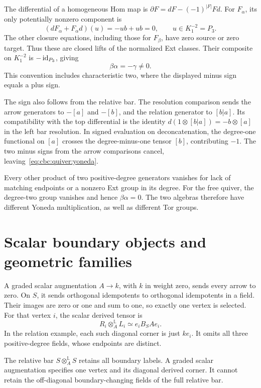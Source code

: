 The differential of a homogeneous Hom map is $\partial F=dF-(-1)^{|F|}Fd$.
For $F_\alpha$, its only potentially nonzero component is
\[
 (dF_\alpha+F_\alpha d)(u)=-ub+ub=0,
 \qquad u\in K_1^{-2}=P_3.
\]
The other closure equations, including those for $F_\beta$, have zero source or zero target.
Thus these are closed lifts of the normalized Ext classes.
Their composite on $K_1^{-2}$ is $-\operatorname{id}_{P_3}$, giving
\begin{equation}\label{eq:cbc:quiver:yoneda}
 \beta\alpha=-\gamma\ne0.
\end{equation}
This convention includes characteristic two, where the displayed minus sign equals a plus sign.

The sign also follows from the relative bar.
The resolution comparison sends the arrow generators to $-[a]$ and $-[b]$, and the relation generator to $[b|a]$.
Its compatibility with the top differential is the identity
$d(1\otimes[b|a])=-b\otimes[a]$ in the left bar resolution.
In signed evaluation on deconcatenation, the degree-one functional on $[a]$ crosses the degree-minus-one tensor $[b]$, contributing $-1$.
The two minus signs from the arrow comparisons cancel, leaving~\eqref{eq:cbc:quiver:yoneda}.

Every other product of two positive-degree generators vanishes for lack of matching endpoints or a nonzero Ext group in its degree.
For the free quiver, the degree-two group vanishes and hence $\beta\alpha=0$.
The two algebras therefore have different Yoneda multiplication, as well as different Tor groups.

\section{Scalar boundary objects and geometric families}

A graded scalar augmentation $A\to k$, with $k$ in weight zero, sends every arrow to zero.
On $S$, it sends orthogonal idempotents to orthogonal idempotents in a field.
Their images are zero or one and sum to one, so exactly one vertex is selected.
For that vertex $i$, the scalar derived tensor is
\[
 R_i\otimes_A^{\mathbb L}L_i\simeq e_iB_SA e_i.
\]
In the relation example, each such diagonal corner is just $ke_i$.
It omits all three positive-degree fields, whose endpoints are distinct.

\begin{nogobox}[title={Scalar augmentation and vertex labels}]
The relative bar $S\otimes_A^{\mathbb L}S$ retains all boundary labels.
A graded scalar augmentation specifies one vertex and its diagonal derived corner.
It cannot retain the off-diagonal boundary-changing fields of the full relative bar.
\end{nogobox}


